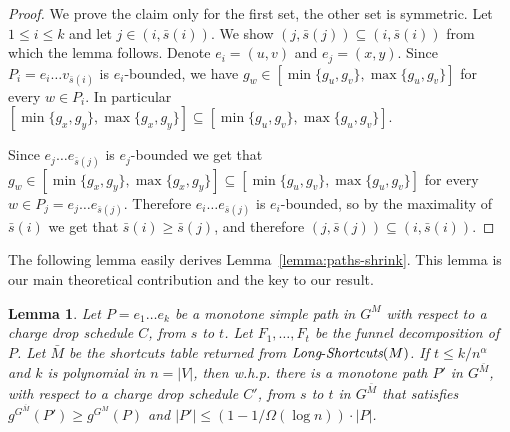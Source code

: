 \documentclass[11pt]{article}
\newtheorem{lemma}[theorem]{Lemma}
\newcommand{\LS}{\mbox{{\it Long}-{\it Shortcuts}}}
\begin{document}
\begin{proof}
    We prove the claim only for the first set, the other set is symmetric. Let $1\le i \le k$ and let $j \in (i, \bar{s}(i))$. We show $(j, \bar{s}(j)) \subseteq (i, \bar{s}(i))$ from which the lemma follows. Denote $e_i=(u,v)$ and $e_j = (x,y)$. Since $P_i=e_i \ldots v_{\bar{s}(i)}$ is $e_i$-bounded, we have $g_{w} \in [\min\{ g_u,g_v\}, \max\{ g_u,g_v\}]$ for every $w\in P_i$. In particular $[\min\{g_{x}, g_{y}\}, \max \{ g_{x}, g_{y} \} ] \subseteq [\min\{ g_u,g_v\}, \max\{ g_u,g_v\}]$.  
    
    Since $e_j \ldots e_{\bar{s}(j)}$ is $e_j$-bounded we get that $g_{w} \in [\min\{g_{x}, g_{y}\}, \max \{ g_{x}, g_{y} \} ] \subseteq [\min\{ g_u,g_v\}, \max\{ g_u,g_v\}]$ for every $w\in P_j= e_j \ldots e_{\bar{s}(j)}$. Therefore $e_i\ldots e_{\bar{s}(j)}$ is $e_i$-bounded, so by the maximality of $\bar{s}(i)$ we get that $\bar{s}(i) \ge \bar{s}(j)$, and therefore $(j,\bar{s}(j)) \subseteq (i,\bar{s}(i))$.
\end{proof}



The following lemma easily derives Lemma~\ref{lemma:paths-shrink}. This lemma is our main theoretical contribution and the key to our result. 

\begin{lemma}\label{lemma:long-shortcuts-shrinks}
    Let $P = e_1 \ldots e_k$ be a monotone simple path in $G^M$ with respect to a charge drop schedule $C$, from $s$ to $t$. Let $F_1,\ldots, F_t$ be the funnel decomposition of $P$. Let $\bar{M}$ be the shortcuts table returned from $\LS(M)$. If $t \le k / n^\alpha $ and $k$ is polynomial in $n=|V|$, then w.h.p. there is a monotone path $P'$ in $G^{\bar{M}}$, with respect to a charge drop schedule $C'$, from $s$ to $t$ in $G^{\bar{M}}$ that satisfies $g^{G^{\bar{M}}}(P')\ge g^{G^M}(P)$ and $|P'| \le (1-1/\Omega(\log n))\cdot |P|$. 
\end{lemma}
\end{document}
